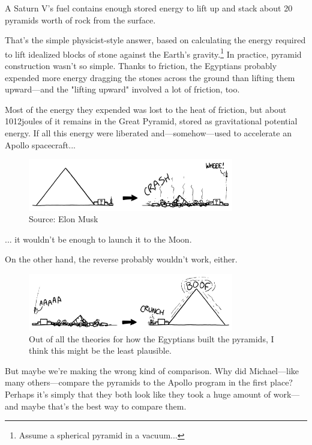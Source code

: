 {{A Saturn V's fuel contains enough stored energy to lift up and stack about 20 pyramids worth of rock from the surface.}

{That's the simple physicist-style answer, based on calculating the energy required to lift idealized blocks of stone against the Earth's gravity.{\footnote{Assume a spherical pyramid in a vacuum...} } In practice, pyramid construction wasn't so simple. Thanks to friction, the Egyptians probably expended more energy dragging the stones across the ground than lifting them upward—and the "lifting upward" involved a lot of friction, too.}

{Most of the energy they expended was lost to the heat of friction, but about 1012joules of it remains in the Great Pyramid, stored as gravitational potential energy. If all this energy were liberated and—somehow—used to accelerate an Apollo spacecraft...}

\begin{figure}[!htbp]
\centering
\includegraphics[scale=0.5, max width=0.8\textwidth]{imgs/a/95/pyramid_launch.png}
\caption{Source: Elon Musk}
\end{figure}

{... it wouldn't be enough to launch it to the Moon.}

{On the other hand, the reverse probably wouldn't work, either.}

\begin{figure}[!htbp]
\centering
\includegraphics[scale=0.5, max width=0.8\textwidth]{imgs/a/95/pyramid_reverse.png}
\caption{Out of all the theories for how the Egyptians built the pyramids, I think this might be the least plausible.}
\end{figure}

{But maybe we're making the wrong kind of comparison. Why did Michael—like many others—compare the pyramids to the Apollo program in the first place? Perhaps it's simply that they both look like they took a huge amount of work—and maybe that's the best way to compare them.}

}
